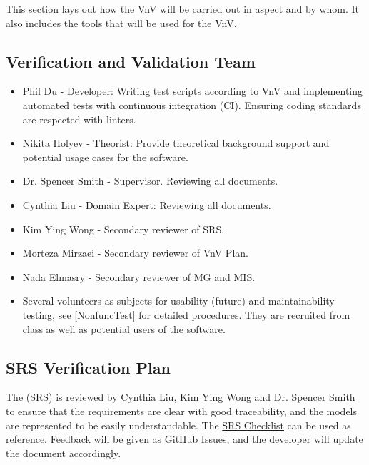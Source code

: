 \documentclass[12pt, titlepage]{article}
\begin{document}
This section lays out how the VnV will be carried out in aspect and by whom. It also includes the tools that will be used for the VnV.


\subsection{Verification and Validation Team}

\begin{itemize}
  \item Phil Du - Developer: Writing test scripts according to VnV and implementing automated tests with continuous integration (CI). Ensuring coding standards are respected with linters.
  \item Nikita Holyev - Theorist: Provide theoretical background support and potential usage cases for the software.
  \item Dr. Spencer Smith - Supervisor. Reviewing all documents.
  \item Cynthia Liu - Domain Expert: Reviewing all documents.
  \item Kim Ying Wong - Secondary reviewer of SRS.
  \item Morteza Mirzaei - Secondary reviewer of VnV Plan.
  \item Nada Elmasry - Secondary reviewer of MG and MIS.
  \item Several volunteers as subjects for usability (future) and maintainability testing, see \ref{NonfuncTest} for detailed procedures. They are recruited from class as well as potential users of the software.
\end{itemize}


\subsection{SRS Verification Plan}

The (\href{https://github.com/omltcat/turbulent-flow/blob/main/docs/SRS/SRS.pdf}{SRS}) is reviewed by Cynthia Liu, Kim Ying Wong and Dr. Spencer Smith to ensure that the requirements are clear with good traceability, and the models are represented to be easily understandable. The \href{https://github.com/omltcat/turbulent-flow/blob/main/docs/Checklists/SRS-Checklist.pdf}{SRS Checklist} can be used as reference. Feedback will be given as GitHub Issues, and the developer will update the document accordingly.
\end{document}
